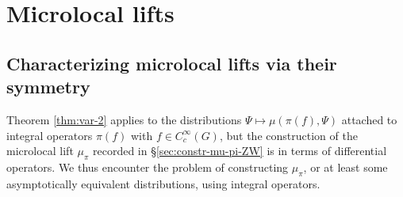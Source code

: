 \documentclass[reqno,10pt]{amsart}
\theoremstyle{plain} %
\theoremstyle{definition}
\theoremstyle{plain} %
\theoremstyle{remark}
\theoremstyle{itplain} %
\theoremstyle{remark} %
\numberwithin{equation}{section}
\begin{document}
\section{Microlocal lifts}\label{sec:35ac3e579c}

\subsection{Characterizing microlocal lifts via their symmetry}\label{sec:states-approx-microlocal}
Theorem \ref{thm:var-2} applies to the distributions $\Psi \mapsto \mu(\pi(f),\Psi)$ attached to integral operators $\pi(f)$ with $f \in C_c^\infty(G)$, but the construction of the microlocal lift $\mu_\pi$ recorded in \S\ref{sec:constr-mu-pi-ZW} is in terms of differential operators.  We thus encounter the problem of constructing $\mu_\pi$, or at least some asymptotically equivalent distributions, using integral operators.
\end{document}
